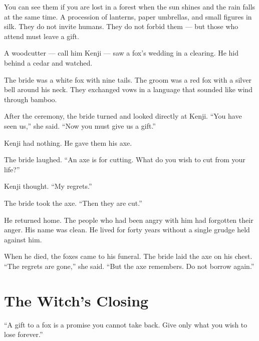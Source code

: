 \documentclass[10pt,twoside]{book}
\begin{document}
You can see them if you are lost in a forest when the sun shines and the rain falls at the same time. A procession of lanterns, paper umbrellas, and small figures in silk. They do not invite humans. They do not forbid them --- but those who attend must leave a gift.

A woodcutter --- call him Kenji --- saw a fox's wedding in a clearing. He hid behind a cedar and watched.

The bride was a white fox with nine tails. The groom was a red fox with a silver bell around his neck. They exchanged vows in a language that sounded like wind through bamboo.

After the ceremony, the bride turned and looked directly at Kenji. ``You have seen us,'' she said. ``Now you must give us a gift.''

Kenji had nothing. He gave them his axe.

The bride laughed. ``An axe is for cutting. What do you wish to cut from your life?''

Kenji thought. ``My regrets.''

The bride took the axe. ``Then they are cut.''

He returned home. The people who had been angry with him had forgotten their anger. His name was clean. He lived for forty years without a single grudge held against him.

When he died, the foxes came to his funeral. The bride laid the axe on his chest. ``The regrets are gone,'' she said. ``But the axe remembers. Do not borrow again.''

\section*{The Witch's Closing}
``A gift to a fox is a promise you cannot take back. Give only what you wish to lose forever.''
\end{document}
